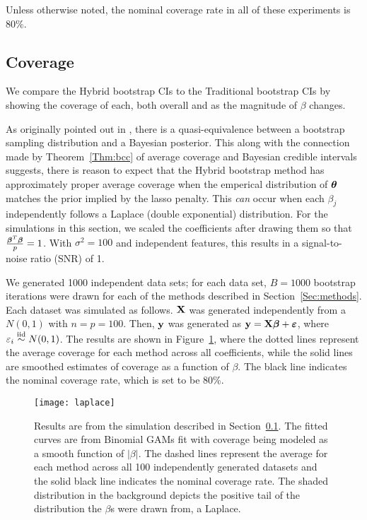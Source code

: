 Unless otherwise noted, the nominal coverage rate in all of these experiments is 80\%.

\subsection{Coverage}\label{Sec:Coverage}

We compare the Hybrid bootstrap CIs to the Traditional bootstrap CIs by showing the coverage of each, both overall and as the magnitude of $\beta$ changes.

As originally pointed out in \cite{Rubin1981}, there is a quasi-equivalence between a bootstrap sampling distribution and a Bayesian posterior. This along with the connection made by Theorem~\ref{Thm:bcc} of average coverage and Bayesian credible intervals suggests, there is reason to expect that the Hybrid bootstrap method has approximately proper average coverage when the emperical distribution of $\boldsymbol{\theta}$ matches the prior implied by the lasso penalty. This \emph{can} occur when each $\beta_j$ independently follows a Laplace (double exponential) distribution. For the simulations in this section, we scaled the coefficients after drawing them so that $\frac{\boldsymbol{\beta}^T\boldsymbol{\beta}}{p} = 1$. With $\sigma^2=100$ and independent features, this results in a signal-to-noise ratio (SNR) of 1.

We generated 1000 independent data sets; for each data set, $B = 1000$ bootstrap iterations were drawn for each of the methods described in Section~\ref{Sec:methods}. Each dataset was simulated as follows. $\mathbf{X}$ was generated independently from a $N(0, 1)$ with $n = p = 100$. Then, $\mathbf{y}$ was generated as $\mathbf{y} = \mathbf{X}\boldsymbol{\beta} + \boldsymbol{\varepsilon}$, where $\varepsilon_i \overset{\text{iid}}{\sim} N(0, 1)$. The results are shown in Figure~\ref{Fig:laplace}, where the dotted lines represent the average coverage for each method across all coefficients, while the solid lines are smoothed estimates of coverage as a function of $\beta$. The black line indicates the nominal coverage rate, which is set to be 80\%.

\begin{figure}[hbtp]
  \begin{center}
  \texttt{[image: laplace]}
  \caption{\label{Fig:laplace} Results are from the simulation described in Section~\ref{Sec:Coverage}. The fitted curves are from Binomial GAMs fit with coverage being modeled as a smooth function of $|\beta|$. The dashed lines represent the average for each method across all 100 independently generated datasets and the solid black line indicates the nominal coverage rate. The shaded distribution in the background depicts the positive tail of the distribution the $\beta$s were drawn from, a Laplace.}
  \end{center}
\end{figure}

